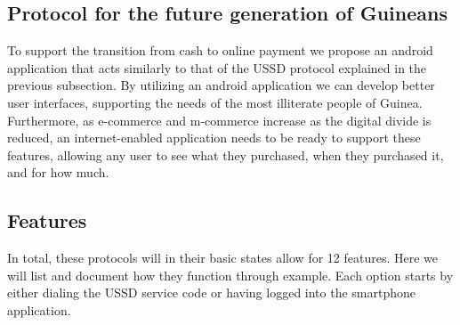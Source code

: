 \documentclass[11pt, a4paper]{article}
\begin{document}
\subsection{Protocol for the future generation of Guineans}
To support the transition from cash to online payment we propose an android application that acts similarly to that of the USSD protocol explained in the previous subsection. By utilizing an android application we can develop better user interfaces, supporting the needs of the most illiterate people of Guinea. Furthermore, as e-commerce and m-commerce increase as the digital divide is reduced, an internet-enabled application needs to be ready to support these features, allowing any user to see what they purchased, when they purchased it, and for how much.

\subsection{Features}
In total, these protocols will in their basic states allow for 12 features. Here we will list and document how they function through example. Each option starts by either dialing the USSD service code or having logged into the smartphone application.
\end{document}
